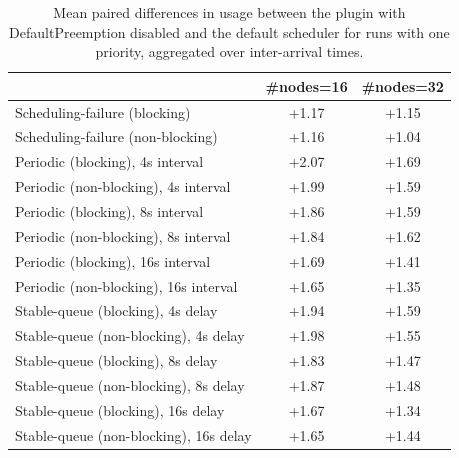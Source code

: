 \begin{table}[t]
\tiny
\setlength{\tabcolsep}{1.2pt}
\renewcommand{\arraystretch}{1.12}
\centering
\caption{Mean paired differences in usage between the plugin with DefaultPreemption disabled and the default scheduler for runs with one priority, aggregated over inter-arrival times.}
\label{tab:usage-defpreempt0-prio1-std0-agg-arrival}
\begin{tabular}{l c c}
\toprule
 & \#nodes=16 & \#nodes=32 \\
\midrule
Scheduling-failure (blocking) & +1.17 & +1.15 \\
Scheduling-failure (non-blocking) & +1.16 & +1.04 \\
Periodic (blocking), 4s interval & +2.07 & +1.69 \\
Periodic (non-blocking), 4s interval & +1.99 & +1.59 \\
Periodic (blocking), 8s interval & +1.86 & +1.59 \\
Periodic (non-blocking), 8s interval & +1.84 & +1.62 \\
Periodic (blocking), 16s interval & +1.69 & +1.41 \\
Periodic (non-blocking), 16s interval & +1.65 & +1.35 \\
Stable-queue (blocking), 4s delay & +1.94 & +1.59 \\
Stable-queue (non-blocking), 4s delay & +1.98 & +1.55 \\
Stable-queue (blocking), 8s delay & +1.83 & +1.47 \\
Stable-queue (non-blocking), 8s delay & +1.87 & +1.48 \\
Stable-queue (blocking), 16s delay & +1.67 & +1.34 \\
Stable-queue (non-blocking), 16s delay & +1.65 & +1.44 \\
\bottomrule
\end{tabular}
\end{table}
